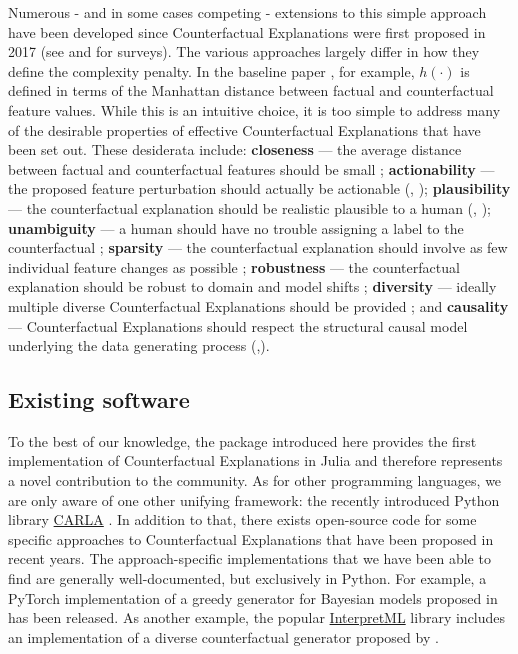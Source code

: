 \documentclass{juliacon}
\begin{document}
Numerous - and in some cases competing - extensions to this simple
approach have been developed since Counterfactual Explanations were
first proposed in 2017 (see \cite{verma2020counterfactual} and
\cite{karimi2020survey} for surveys). The various approaches largely
differ in how they define the complexity penalty. In the baseline paper
\cite{wachter2017counterfactual}, for example, \(h(\cdot)\) is defined
in terms of the Manhattan distance between factual and counterfactual
feature values. While this is an intuitive choice, it is too simple to
address many of the desirable properties of effective Counterfactual
Explanations that have been set out. These desiderata include:
\textbf{closeness} --- the average distance between factual and
counterfactual features should be small
\cite{wachter2017counterfactual}; \textbf{actionability} --- the
proposed feature perturbation should actually be actionable
(\cite{ustun2019actionable}, \cite{poyiadzi2020face});
\textbf{plausibility} --- the counterfactual explanation should be
realistic plausible to a human (\cite{joshi2019realistic},
\cite{schut2021generating}); \textbf{unambiguity} --- a human should
have no trouble assigning a label to the counterfactual
\cite{schut2021generating}; \textbf{sparsity} --- the counterfactual
explanation should involve as few individual feature changes as possible
\cite{schut2021generating}; \textbf{robustness} --- the counterfactual
explanation should be robust to domain and model shifts
\cite{upadhyay2021robust}; \textbf{diversity} --- ideally multiple
diverse Counterfactual Explanations should be provided
\cite{mothilal2020explaining}; and \textbf{causality} --- Counterfactual
Explanations should respect the structural causal model underlying the
data generating process
(\cite{karimi2020algorithmic},\cite{karimi2021algorithmic}).

\hypertarget{existing-software}{%
\subsection{Existing software}\label{existing-software}}

To the best of our knowledge, the package introduced here provides the
first implementation of Counterfactual Explanations in Julia and
therefore represents a novel contribution to the community. As for other
programming languages, we are only aware of one other unifying
framework: the recently introduced Python library
\href{https://carla-counterfactual-and-recourse-library.readthedocs.io/en/latest/?badge=latest}{CARLA}
\cite{pawelczyk2021carla}. In addition to that, there exists open-source
code for some specific approaches to Counterfactual Explanations that
have been proposed in recent years. The approach-specific
implementations that we have been able to find are generally
well-documented, but exclusively in Python. For example, a PyTorch
implementation of a greedy generator for Bayesian models proposed in
\cite{schut2021generating} has been released. As another example, the
popular \href{https://github.com/interpretml}{InterpretML} library
includes an implementation of a diverse counterfactual generator
proposed by \cite{mothilal2020explaining}.
\end{document}
